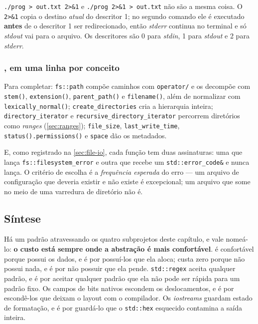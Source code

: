 \begin{armadilha}
\texttt{./prog > out.txt 2>\&1} e \texttt{./prog 2>\&1 > out.txt} não são a
mesma coisa. O \texttt{2>\&1} copia o destino \emph{atual} do descritor 1; no
segundo comando ele é executado \textbf{antes} de o descritor 1 ser
redirecionado, então \emph{stderr} continua no terminal e só \emph{stdout} vai
para o arquivo. Os descritores são 0 para \emph{stdin}, 1 para \emph{stdout} e 2
para \emph{stderr}.
\end{armadilha}

\subsubsection{, em uma linha por conceito}

Para completar: \texttt{fs::path} compõe caminhos com \texttt{operator/} e os
decompõe com \texttt{stem()}, \texttt{extension()}, \texttt{parent\_path()} e
\texttt{filename()}, além de normalizar com \texttt{lexically\_normal()};
\texttt{create\_directories} cria a hierarquia inteira;
\texttt{directory\_iterator} e \texttt{recursive\_directory\_iterator}
percorrem diretórios como
\emph{ranges} (\cref{sec:ranges}); \texttt{file\_size},
\texttt{last\_write\_time}, \texttt{status().permissions()} e \texttt{space}
dão os metadados.

E, como registrado na \cref{sec:file-io}, cada função tem duas assinaturas: uma
que lança \texttt{fs::filesystem\_error} e outra que recebe um
\texttt{std::error\_code\&} e nunca lança. O critério de escolha é a
\emph{frequência esperada} do erro --- um arquivo de configuração que deveria
existir e não existe é excepcional; um arquivo que some no meio de uma varredura
de diretório não é.

\subsection{Síntese}

Há um padrão atravessando os quatro subprojetos deste capítulo, e vale nomeá-lo:
\textbf{o custo está sempre onde a abstração é mais confortável}.
 é confortável porque possui os dados, e é por possuí-los
que ela aloca;  custa zero porque não possui nada, e é
por não possuir que ela pende. \texttt{std::regex} aceita qualquer padrão, e é
por aceitar qualquer padrão que ela não pode ser rápida para um padrão fixo. Os
campos de bits nativos escondem os deslocamentos, e é por escondê-los que
deixam o layout com o compilador. Os \emph{iostreams} guardam estado de
formatação, e é por guardá-lo que o \texttt{std::hex} esquecido contamina a
saída inteira.

